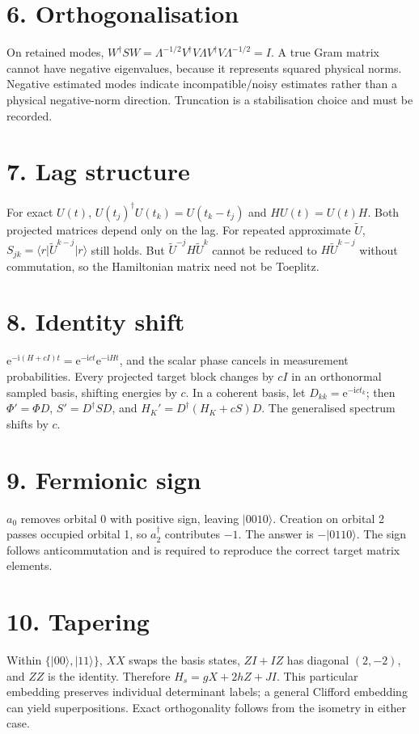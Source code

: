 \documentclass[11pt,a4paper,oneside]{report}
\newcommand{\ket}[1]{\lvert #1\rangle}
\newcommand{\bra}[1]{\langle #1\rvert}
\newcommand{\I}{\mathrm i}
\newcommand{\e}{\mathrm e}
\begin{document}
\section*{6. Orthogonalisation}
On retained modes, $W^\dagger SW=\Lambda^{-1/2}V^\dagger V\Lambda V^\dagger V\Lambda^{-1/2}=I$. A true Gram matrix cannot have negative eigenvalues, because it represents squared physical norms. Negative estimated modes indicate incompatible/noisy estimates rather than a physical negative-norm direction. Truncation is a stabilisation choice and must be recorded.

\section*{7. Lag structure}
For exact $U(t)$, $U(t_j)^\dagger U(t_k)=U(t_k-t_j)$ and $HU(t)=U(t)H$. Both projected matrices depend only on the lag. For repeated approximate $\widetilde U$, $S_{jk}=\bra r\widetilde U^{k-j}\ket r$ still holds. But $\widetilde U^{-j}H\widetilde U^k$ cannot be reduced to $H\widetilde U^{k-j}$ without commutation, so the Hamiltonian matrix need not be Toeplitz.

\section*{8. Identity shift}
$\e^{-\I(H+cI)t}=\e^{-\I ct}\e^{-\I Ht}$, and the scalar phase cancels in measurement probabilities. Every projected target block changes by $cI$ in an orthonormal sampled basis, shifting energies by $c$. In a coherent basis, let $D_{kk}=\e^{-\I ct_k}$; then $\Phi'=\Phi D$, $S'=D^\dagger SD$, and $H_K'=D^\dagger(H_K+cS)D$. The generalised spectrum shifts by $c$.

\section*{9. Fermionic sign}
$a_0$ removes orbital 0 with positive sign, leaving $\ket{0010}$. Creation on orbital 2 passes occupied orbital 1, so $a_2^\dagger$ contributes $-1$. The answer is $-\ket{0110}$. The sign follows anticommutation and is required to reproduce the correct target matrix elements.

\section*{10. Tapering}
Within $\{\ket{00},\ket{11}\}$, $XX$ swaps the basis states, $ZI+IZ$ has diagonal $(2,-2)$, and $ZZ$ is the identity. Therefore $H_s=gX+2hZ+JI$. This particular embedding preserves individual determinant labels; a general Clifford embedding can yield superpositions. Exact orthogonality follows from the isometry in either case.
\end{document}
